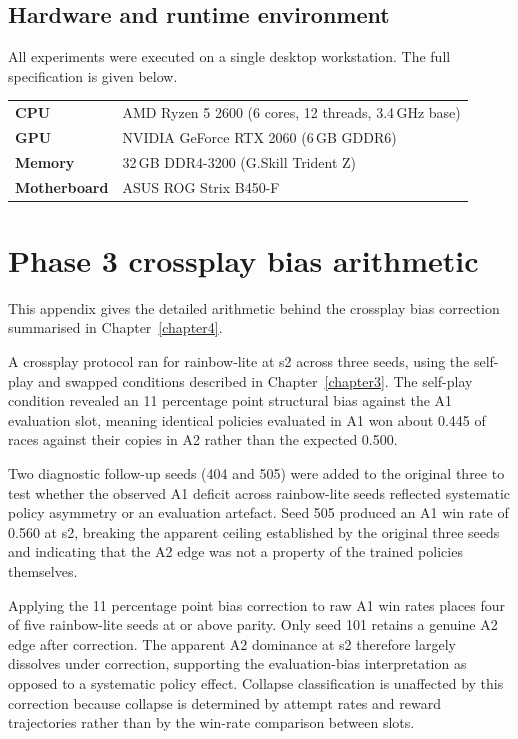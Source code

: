 \begin{appendices}
\section{Hardware and runtime environment}
All experiments were executed on a single desktop workstation. The full specification is given below.

\begin{tabular}{@{}ll@{}}
\textbf{CPU}         & AMD Ryzen 5 2600 (6 cores, 12 threads, 3.4\,GHz base) \\
\textbf{GPU}         & NVIDIA GeForce RTX 2060 (6\,GB GDDR6) \\
\textbf{Memory}      & 32\,GB DDR4-3200 (G.Skill Trident Z) \\
\textbf{Motherboard} & ASUS ROG Strix B450-F \\
\end{tabular}

\chapter{Phase 3 crossplay bias arithmetic}
\label{appendix:phase3-crossplay}

This appendix gives the detailed arithmetic behind the crossplay bias correction summarised in Chapter~\ref{chapter4}.

A crossplay protocol ran for rainbow-lite at s2 across three seeds, using the self-play and swapped conditions described in Chapter~\ref{chapter3}. The self-play condition revealed an 11 percentage point structural bias against the A1 evaluation slot, meaning identical policies evaluated in A1 won about 0.445 of races against their copies in A2 rather than the expected 0.500.

Two diagnostic follow-up seeds (404 and 505) were added to the original three to test whether the observed A1 deficit across rainbow-lite seeds reflected systematic policy asymmetry or an evaluation artefact. Seed 505 produced an A1 win rate of 0.560 at s2, breaking the apparent ceiling established by the original three seeds and indicating that the A2 edge was not a property of the trained policies themselves.

Applying the 11 percentage point bias correction to raw A1 win rates places four of five rainbow-lite seeds at or above parity. Only seed 101 retains a genuine A2 edge after correction. The apparent A2 dominance at s2 therefore largely dissolves under correction, supporting the evaluation-bias interpretation as opposed to a systematic policy effect. Collapse classification is unaffected by this correction because collapse is determined by attempt rates and reward trajectories rather than by the win-rate comparison between slots.


\end{appendices}
